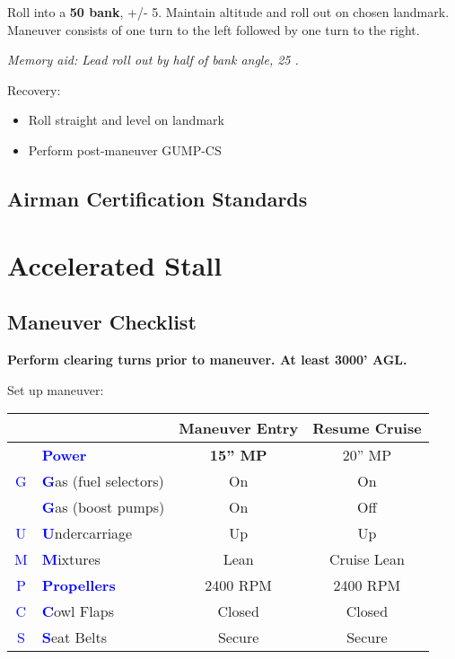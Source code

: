 {Roll into a \textbf{50\degree{} bank}, +/- 5\degree{}. Maintain altitude and roll out on chosen landmark.
Maneuver consists of one turn to the left followed by one turn to the right.

\emph{Memory aid: Lead roll out by half of bank angle, 25 \degree{}.}

Recovery:
\begin{itemize}[label={}]
\item Roll straight and level on landmark
\item Perform post-maneuver GUMP-CS
\end{itemize}

\subsection{Airman Certification Standards}
\newpage

\section{Accelerated Stall}
\subsection{Maneuver Checklist}

\textbf{Perform clearing turns prior to maneuver. At least 3000' AGL.}

Set up maneuver:

\begin{table}[H]
\centering
\begin{tabular}{|c|l|c|c|}
\hline
                    &                                                 & \textbf{Maneuver Entry} & \textbf{Resume Cruise} \\ \hline
                    & \textcolor{blue}{\textbf{Power}}                & \textbf{15'' MP}        & 20'' MP                \\ \hline
\textcolor{blue}{G} & \textcolor{blue}{\textbf{G}}as (fuel selectors) & On                      & On                     \\
                    & \textcolor{blue}{\textbf{G}}as (boost pumps)    & On                      & Off                    \\ \hline
\textcolor{blue}{U} & \textcolor{blue}{\textbf{U}}ndercarriage        & Up                      & Up                     \\ \hline
\textcolor{blue}{M} & \textcolor{blue}{\textbf{M}}ixtures             & Lean                    & Cruise Lean            \\ \hline
\textcolor{blue}{P} & \textcolor{blue}{\textbf{Propellers}}           & 2400 RPM                & 2400 RPM               \\ \hline
\textcolor{blue}{C} & \textcolor{blue}{\textbf{C}}owl Flaps           & Closed                  & Closed                 \\ \hline
\textcolor{blue}{S} & \textcolor{blue}{\textbf{S}}eat Belts           & Secure                  & Secure                 \\ \hline
\end{tabular}
\end{table}

}
